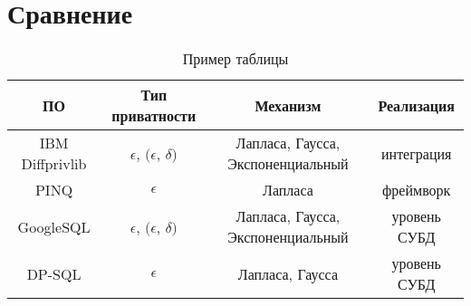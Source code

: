 \chapter{Сравнение}

\begin{table}[h]
	\centering
	\begin{tabular}{|c|c|c|c|}
		\hline
		ПО & Тип приватности & Механизм & Реализация \\ \hline
		IBM Diffprivlib & $\epsilon$, $(\epsilon$, $\delta)$  & \parbox{4.5cm}{Лапласа, Гаусса, Экспоненциальный} & интеграция  \\ \hline
		PINQ &  $\epsilon$ & Лапласа  & фреймворк  \\ \hline
		GoogleSQL  & $\epsilon$, $(\epsilon$, $\delta)$ & \parbox{4.5cm}{Лапласа, Гаусса, Экспоненциальный}  & уровень СУБД \\ \hline
		DP-SQL  & $\epsilon$ & \parbox{4.5cm}{Лапласа, Гаусса}  & уровень СУБД \\ \hline
	\end{tabular}
	\caption{Пример таблицы}
\end{table}
